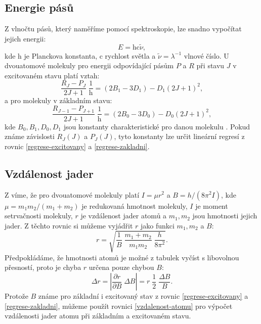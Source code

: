 \documentclass[10pt,a4paper]{article}
\newcommand{\°}{\degree}
\begin{document}
\subsection{Energie pásů}

Z vlnočtu pásů, který naměříme pomocí spektroskopie, lze snadno vypočítat jejich energii:
\begin{equation}
    E = \mathrm{h} \mathrm{c} \tilde\nu,
    \label{energie}
\end{equation}
kde $\mathrm{h}$ je Planckova konstanta, $\mathrm{c}$ rychlost světla a $\tilde\nu = \lambda^{-1}$ vlnové číslo. U dvouatomové molekuly pro energii odpovídající pásům $P$ a $R$ při stavu $J$ v excitovaném stavu platí vztah:
\begin{equation}
    \frac{ R_J  - P_J }{ 2J + 1 } \; \frac{1}{\mathrm{h}}
    =  \left( 2B_1 - 3D_1 \right)  - D_1  \left( 2J+1 \right)^2,
    \label{regrese-excitovany}
\end{equation}
a pro molekuly v základním stavu:
\begin{equation}
    \frac{ R_{J-1}  - P_{J+1} }{ 2J + 1 } \; \frac{1}{\mathrm{h}}
    =  \left( 2B_0 - 3D_0 \right)  - D_0  \left( 2J+1 \right)^2,
    \label{regrese-zakladni}
\end{equation}
kde $B_0, B_1, D_0, D_1$ jsou konstanty charakteristické pro danou molekulu \cite{studijni-text}. Pokud známe závislosti $R_J(J)$ a $P_J(J)$, tyto konstanty lze určit lineární regresí z rovnic \eqref{regrese-excitovany} a \eqref{regrese-zakladni}.

\subsection{Vzdálenost jader}

Z \cite{studijni-text} víme, že pro dvouatomové molekuly platí $I=\mu r^2$ a $B=h / \left( 8 \pi^2 I \right)$, kde $\mu = m_1 m_2 / \left( m_1 + m_2 \right)$ je redukovaná hmotnost molekuly, $I$ je moment setrvačnosti molekuly, $r$ je vzdálenost jader atomů a $m_1, m_2$ jsou hmotnosti jejich jader. Z těchto rovnic si můžeme vyjádřit $r$ jako funkci $m_1, m_2$ a $B$:
\begin{equation}
    r = \sqrt{ \frac{1}{B} \; \frac{m_1 + m_2}{m_1 m_2} \; \frac{h}{8\pi^2} }.
    \label{vzdalenost-atomu}
\end{equation}
Předpokládáme, že hmotnosti atomů je možné z tabulek vyčíst s libovolnou přesností, proto je chyba $r$ určena pouze chybou $B$:
\begin{equation}
    \Delta r = \left| \frac{\partial r}{\partial B} \; \Delta B \right| = r \; \frac{1}{2} \; \frac{\Delta B}{B}.
    \label{vzdalenost-atomu-chyba}
\end{equation}
Protože $B$ známe pro základní i excitovaný stav z rovnic \eqref{regrese-excitovany} a \eqref{regrese-zakladni}, můžeme použít rovnici \eqref{vzdalenost-atomu} pro výpočet vzdálenosti jader atomu při základním a excitovaném stavu.
\end{document}

